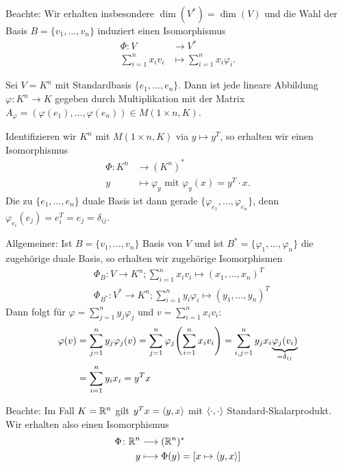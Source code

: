 Beachte: Wir erhalten insbesondere $\dim(V^*) = \dim(V)$ und die Wahl der Basis $B = \{v_1,\dots,v_n\}$ induziert einen Isomorphismus
\begin{align*}
	\Phi\colon V &\longrightarrow V^* \\
	\sum_{i=1}^{n} x_i v_i &\longmapsto \sum_{i=1}^{n} x_i \varphi_i.
\end{align*}

\begin{beispiel}
	\label{bsp:12.4}
	Sei $V = K^n$ mit Standardbasis $\{e_1,\dots,e_n\}$.
	Dann ist jede lineare Abbildung $\varphi \colon K^n \rightarrow K$ gegeben durch Multiplikation mit der Matrix $A_\varphi = (\varphi(e_1),\dots,\varphi(e_n)) \in M(1 \times n,K)$.
	
	Identifizieren wir $K^n$ mit $M(1 \times n, K)$ via $y \mapsto y^T$, so erhalten wir einen Isomorphismus
	\begin{align*}
		\Phi\colon K^n &\longrightarrow (K^n)^* \\
		y &\longmapsto \varphi_y \text{ mit } \varphi_y(x) = y^T \cdot x.
	\end{align*}
	Die zu $\{e_1,\dots,e_n\}$ duale Basis ist dann gerade $\{\varphi_{e_1},\dots,\varphi_{e_n}\}$, denn $\varphi_{e_i}(e_j) = e_i^T = e_j = \delta_{ij}$.
\end{beispiel}

Allgemeiner: Ist $B = \{v_1,\dots,v_n\}$ Basis von $V$ und ist $B^* = \{\varphi_1,\dots,\varphi_n\}$ die zugehörige duale Basis, so erhalten wir zugehörige Isomorphismen
\begin{align*}
	&\Phi_B\colon V \rightarrow K^n; \sum_{i=1}^{n} x_iv_i \mapsto (x_1,\dots,x_n)^T \\
	&\Phi_{B^*}\colon V^* \rightarrow K^n; \sum_{i=1}^{n} y_i\varphi_i \mapsto (y_1,\dots,y_n)^T
\end{align*}
Dann folgt für $\varphi = \sum_{j=1}^{n} y_j \varphi_j$ und $v = \sum_{i=1}^{n} x_i v_i$:
\begin{align*}
	\varphi(v) &= \sum_{j=1}^{n} y_j \varphi_j(v) = \sum_{j=1}^{n} \varphi_j \enb{\sum_{i=1}^{n} x_i v_i} = \sum_{i,j=1}^{n} y_j x_i \Underbrace{\varphi_j(v_i)}{=\delta_{ij}} \\
	&= \sum_{i=1}^{n} y_i x_i = y^Tx
\end{align*}

Beachte: Im Fall $K = \mathbb{R}^n$ gilt $y^Tx = \left\langle y,x\right\rangle$ mit $\left\langle\cdot,\cdot\right\rangle$ Standard-Skalarprodukt.
Wir erhalten also einen Isomorphismus
\begin{align*}
	\Phi \colon \mathbb{R}^n &\longrightarrow (\mathbb{R}^n)^* \\
	y &\longmapsto \Phi(y) = [x \mapsto \left\langle y,x\right\rangle]
\end{align*}

